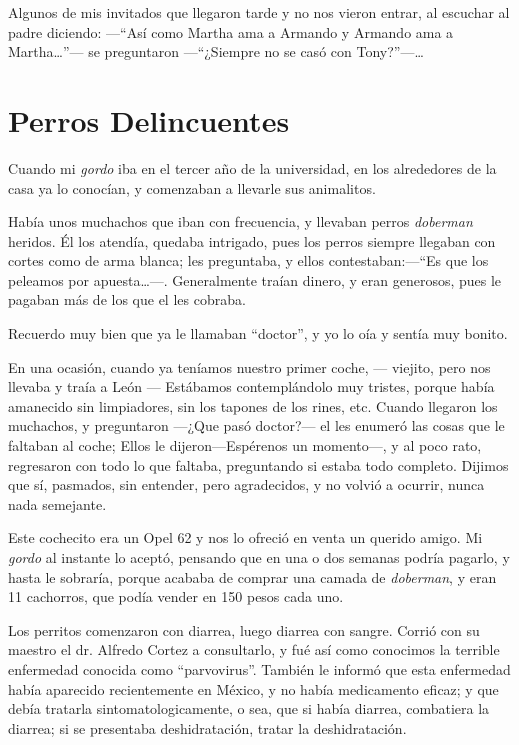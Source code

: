 \documentclass[letterpaper, 12pt]{book}
\begin{document}
Algunos de mis invitados que llegaron tarde y no nos vieron entrar, al escuchar al padre diciendo: ---``Así como Martha ama a Armando y Armando ama a Martha\ldots''--- se preguntaron ---``¿Siempre no se casó con Tony?''---\ldots

\chapter{Perros Delincuentes}
Cuando mi \textit{gordo} iba en el tercer año de la universidad, en los alrededores de la casa ya lo conocían, y comenzaban a llevarle sus animalitos.

Había unos muchachos que iban con frecuencia, y llevaban perros \textit{doberman} heridos. Él los atendía, quedaba intrigado, pues los perros siempre llegaban con cortes como de arma blanca; les preguntaba, y ellos contestaban:---``Es que los peleamos por apuesta\ldots---. Generalmente traían dinero, y eran generosos, pues le pagaban más de los que el les cobraba.

Recuerdo muy bien que ya le llamaban ``doctor'', y yo lo oía y sentía muy bonito.

En una ocasión, cuando ya teníamos nuestro primer coche, --- viejito, pero nos llevaba y traía a León --- Estábamos contemplándolo muy tristes, porque había amanecido sin limpiadores, sin los tapones de los rines, etc. Cuando llegaron los muchachos, y preguntaron ---¿Que pasó doctor?--- el les enumeró las cosas que le faltaban al coche; Ellos le dijeron---Espérenos un momento---, y al poco rato, regresaron con todo lo que faltaba, preguntando si estaba todo completo. Dijimos que sí, pasmados, sin entender, pero agradecidos, y no volvió a ocurrir, nunca nada semejante.

Este cochecito era un Opel 62 y nos lo ofreció en venta un querido amigo. Mi \textit{gordo} al instante lo aceptó, pensando que en una o dos semanas podría pagarlo, y hasta le sobraría, porque acababa de comprar una camada de \textit{doberman}, y eran 11 cachorros, que podía vender en 150 pesos cada uno. 

Los perritos comenzaron con diarrea, luego diarrea con sangre. Corrió con su maestro el dr. Alfredo Cortez a consultarlo, y fué así como conocimos la terrible enfermedad conocida como ``parvovirus''. También le informó que esta enfermedad había aparecido recientemente en México, y no había medicamento eficaz; y que debía tratarla sintomatologicamente, o sea, que si había diarrea, combatiera la diarrea; si se presentaba deshidratación, tratar la deshidratación.
\end{document}
